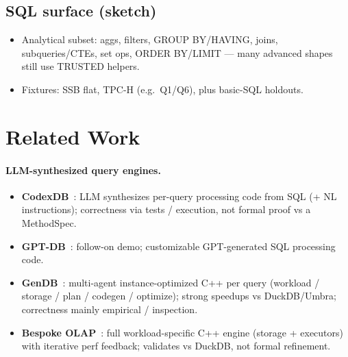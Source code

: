 \documentclass[sigconf, nonacm]{acmart}
\begin{document}
\subsection{SQL surface (sketch)}
\begin{itemize}
  \item Analytical subset: aggs, filters, GROUP BY/HAVING, joins, subqueries/CTEs, set ops, ORDER BY/LIMIT --- many advanced shapes still use TRUSTED helpers.
  \item Fixtures: SSB flat, TPC-H (e.g.\ Q1/Q6), plus basic-SQL holdouts.
\end{itemize}

\section{Related Work}

\paragraph{LLM-synthesized query engines.}
\begin{itemize}
  \item \textbf{CodexDB}~\cite{Trummer2022CodexDB}: LLM synthesizes per-query processing code from SQL (+ NL instructions); correctness via tests / execution, not formal proof vs a MethodSpec.
  \item \textbf{GPT-DB}~\cite{Trummer2023GPTDB}: follow-on demo; customizable GPT-generated SQL processing code.
  \item \textbf{GenDB}~\cite{Lao2026GenDB}: multi-agent instance-optimized C++ per query (workload / storage / plan / codegen / optimize); strong speedups vs DuckDB/Umbra; correctness mainly empirical / inspection.
  \item \textbf{Bespoke OLAP}~\cite{Wehrstein2026Bespoke}: full workload-specific C++ engine (storage + executors) with iterative perf feedback; validates vs DuckDB, not formal refinement.
\end{itemize}
\end{document}

